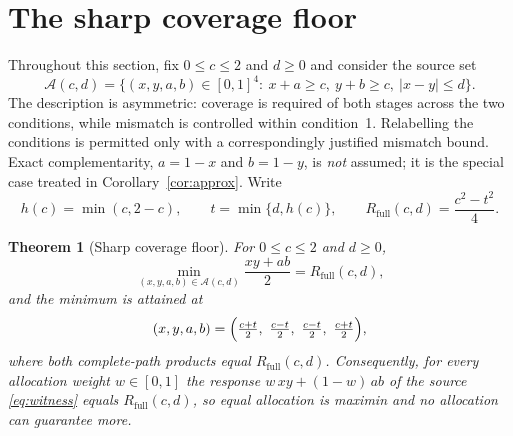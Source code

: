 \documentclass[11pt]{article}
\newtheorem{theorem}{Theorem}[section]
\theoremstyle{definition}
\theoremstyle{remark}
\newcommand{\Rfull}{R_{\mathrm{full}}}
\newcommand{\hc}{h(c)}
\begin{document}
\section{The sharp coverage floor}\label{sec:coverage}

Throughout this section, fix $0\le c\le2$ and $d\ge0$ and consider the source set
\begin{equation}\label{eq:adm}
\mathcal A(c,d)=\bigl\{(x,y,a,b)\in[0,1]^4:\ x+a\ge c,\ y+b\ge c,\ |x-y|\le
d\bigr\}.
\end{equation}
The description is asymmetric: coverage is required of both stages across the two
conditions, while mismatch is controlled within condition~1. Relabelling the
conditions is permitted only with a correspondingly justified mismatch bound.
Exact complementarity, $a=1-x$ and $b=1-y$, is \emph{not} assumed; it is the
special case treated in Corollary~\ref{cor:approx}. Write
\begin{equation}\label{eq:hrange}
\hc=\min(c,2-c),\qquad t=\min\{d,\hc\},\qquad
\Rfull(c,d)=\frac{c^2-t^2}{4}.
\end{equation}

\begin{theorem}[Sharp coverage floor]\label{thm:coverage}
For $0\le c\le2$ and $d\ge0$,
\[
\min_{(x,y,a,b)\in\mathcal A(c,d)}\frac{xy+ab}{2}=\Rfull(c,d),
\]
and the minimum is attained at
\begin{equation}\label{eq:witness}
(x,y,a,b)=\Bigl(\tfrac{c+t}{2},\ \tfrac{c-t}{2},\ \tfrac{c-t}{2},\
\tfrac{c+t}{2}\Bigr),
\end{equation}
where both complete-path products equal $\Rfull(c,d)$. Consequently, for every
allocation weight $w\in[0,1]$ the response $w\,xy+(1-w)\,ab$ of the source
\eqref{eq:witness} equals $\Rfull(c,d)$, so equal allocation is maximin and no
allocation can guarantee more.
\end{theorem}
\end{document}
